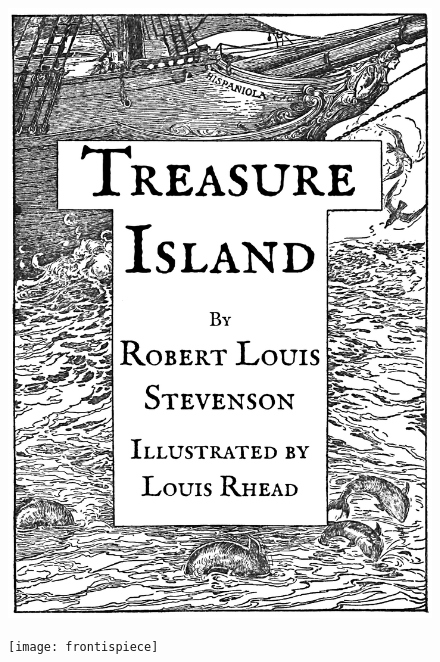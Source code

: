 \documentclass[
paper=a5,
BCOR=7mm,
twoside,
DIV=calc,
12pt,
usegeometry,
chapterprefix,
headings=big]{scrbook} %
\begin{document}
\renewcommand*{\chaptermarkformat}{}
\renewcommand*{\chapterheadendvskip}{\vspace{10pt}}
\renewcommand*{\chapterheadstartvskip}{\vspace{0pt}}

\frontmatter
\pagestyle{empty}

  \recalctypearea
 \vfill
 \begin{figure}[p!]
\centering
\includegraphics[width=\linewidth]{titlepage}
\end{figure}
\vfill
\thispagestyle{empty}

\clearpage
{}
{\headsep=10pt
\headheight=45pt
 \vfill
 \begin{figure}[p!]
\centering
\texttt{[image: frontispiece]}
\caption[\textbf{Frontispiece}]{}
\end{figure}
\vfill
\thispagestyle{empty}
\clearpage}
\end{document}
